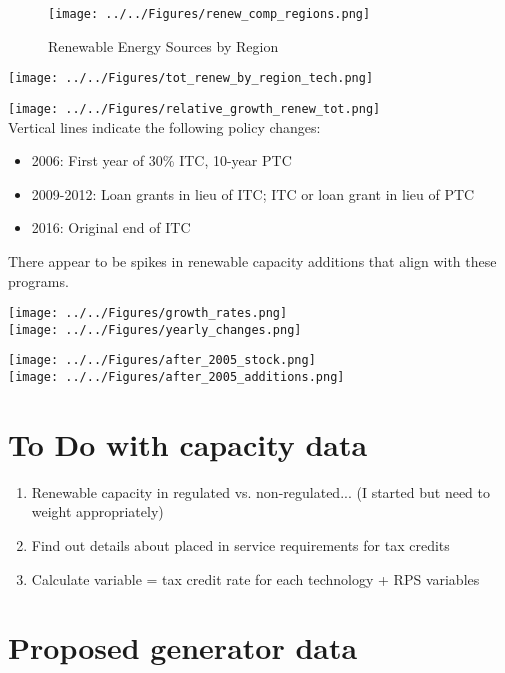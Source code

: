 \documentclass[11pt, oneside]{article}   	%
\begin{document}
\begin{figure}
\caption{Renewable Energy Sources by Region}
\texttt{[image: ../../Figures/renew\_comp\_regions.png]}
\end{figure}
\newpage
\texttt{[image: ../../Figures/tot\_renew\_by\_region\_tech.png]}

\newpage

\texttt{[image: ../../Figures/relative\_growth\_renew\_tot.png]}
\\

Vertical lines indicate the following policy changes:
\begin{itemize}
\item  2006:  First year of 30\% ITC, 10-year PTC
\item 2009-2012: Loan grants in lieu of ITC; ITC or loan grant in lieu of PTC
\item  2016: Original end of ITC  
 \end{itemize}
There appear to be spikes in renewable capacity additions that align with these programs. 

\texttt{[image: ../../Figures/growth\_rates.png]}\\
\texttt{[image: ../../Figures/yearly\_changes.png]}



\newpage
\texttt{[image: ../../Figures/after\_2005\_stock.png]}\\
\texttt{[image: ../../Figures/after\_2005\_additions.png]}

\newpage

\section{To Do with capacity data}
\begin{enumerate}
\item Renewable capacity in regulated vs. non-regulated... (I started but need to weight appropriately)
\item Find out details about placed in service requirements for tax credits
\item Calculate variable = tax credit rate for each technology + RPS variables
\end{enumerate}

\newpage
\section{Proposed generator data}
\end{document}
